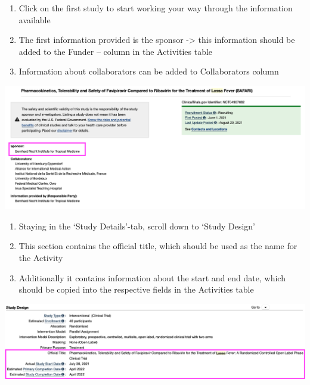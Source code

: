 \documentclass[
]{book}
\begin{document}
\begin{enumerate}
\def\labelenumi{\arabic{enumi}.}
\setcounter{enumi}{3}
\item
  Click on the first study to start working your way through the information available
\item
  The first information provided is the sponsor -\textgreater{} this information should be added to the Funder -- column in the Activities table
\item
  Information about collaborators can be added to Collaborators column
\end{enumerate}

\includegraphics{images/clinicaltrial4.png}

\begin{enumerate}
\def\labelenumi{\arabic{enumi}.}
\setcounter{enumi}{6}
\item
  Staying in the `Study Details'-tab, scroll down to `Study Design'
\item
  This section contains the official title, which should be used as the name for the Activity
\item
  Additionally it contains information about the start and end date, which should be copied into the respective fields in the Activities table
\end{enumerate}

\includegraphics{images/clinicaltrial5.png}
\end{document}
